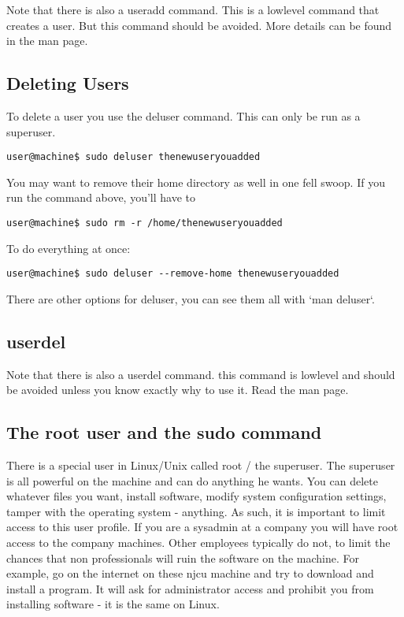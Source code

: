 \documentclass[10pt]{article}
\begin{document}
Note that there is also a useradd command. This is a lowlevel command that creates a user. But this command should be avoided. More details can be found in the man page.


\subsection{Deleting Users}

To delete a user you use the deluser command. This can only be run as a superuser. 

\begin{lstlisting}[style=term]
user@machine$ sudo deluser thenewuseryouadded
\end{lstlisting}

You may want to remove their home directory as well in one fell swoop. If you run the command above, you'll have to 

\begin{lstlisting}[style=term]
user@machine$ sudo rm -r /home/thenewuseryouadded
\end{lstlisting}

To do everything at once:

\begin{lstlisting}[style=term]
user@machine$ sudo deluser --remove-home thenewuseryouadded
\end{lstlisting}

There are other options for deluser, you can see them all with `man deluser`.

\subsection{userdel}

Note that there is also a userdel command. 
this command is lowlevel and should be avoided unless you know exactly why to use it. Read the man page.


\subsection{ The root user and the sudo command}

There is a special user in Linux/Unix called root / the superuser. The superuser is all powerful on the machine and can do anything he wants. You can delete whatever files you want, install software, modify system configuration settings, tamper with the operating system - anything. As such, it is important to limit access to this user profile. If you are a sysadmin at a company you will have root access to the company machines. Other employees typically do not, to limit the chances that non professionals will ruin the software on the machine. For example, go on the internet on these njcu machine and try to download and install a program. It will ask for administrator access and prohibit you from installing software - it is the same on Linux.
\end{document}
